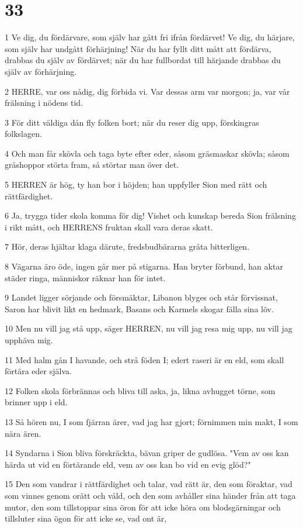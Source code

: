 \chapter{33}

\par 1 Ve dig, du fördärvare, som själv har gått fri ifrån fördärvet! Ve dig, du härjare, som själv har undgått förhärjning! När du har fyllt ditt mått att fördärva, drabbas du själv av fördärvet; när du har fullbordat till härjande drabbas du själv av förhärjning.
\par 2 HERRE, var oss nådig, dig förbida vi. Var dessas arm var morgon; ja, var vår frälsning i nödens tid.
\par 3 För ditt väldiga dån fly folken bort; när du reser dig upp, förskingras folkslagen.
\par 4 Och man får skövla och taga byte efter eder, såsom gräsmaskar skövla; såsom gräshoppor störta fram, så störtar man över det.
\par 5 HERREN är hög, ty han bor i höjden; han uppfyller Sion med rätt och rättfärdighet.
\par 6 Ja, trygga tider skola komma för dig! Vishet och kunskap bereda Sion frälsning i rikt mått, och HERRENS fruktan skall vara deras skatt.
\par 7 Hör, deras hjältar klaga därute, fredsbudbärarna gråta bitterligen.
\par 8 Vägarna äro öde, ingen går mer på stigarna. Han bryter förbund, han aktar städer ringa, människor räknar han för intet.
\par 9 Landet ligger sörjande och försmäktar, Libanon blyges och står förvissnat, Saron har blivit likt en hedmark, Basans och Karmels skogar fälla sina löv.
\par 10 Men nu vill jag stå upp, säger HERREN, nu vill jag resa mig upp, nu vill jag upphäva mig.
\par 11 Med halm gån I havande, och strå föden I; edert raseri är en eld, som skall förtära eder själva.
\par 12 Folken skola förbrännas och bliva till aska, ja, likna avhugget törne, som brinner upp i eld.
\par 13 Så hören nu, I som fjärran ärer, vad jag har gjort; förnimmen min makt, I som nära ären.
\par 14 Syndarna i Sion bliva förskräckta, bävan griper de gudlösa. "Vem av oss kan härda ut vid en förtärande eld, vem av oss kan bo vid en evig glöd?"
\par 15 Den som vandrar i rättfärdighet och talar, vad rätt är, den som föraktar, vad som vinnes genom orätt och våld, och den som avhåller sina händer från att taga mutor, den som tillstoppar sina öron för att icke höra om blodsgärningar och tillsluter sina ögon för att icke se, vad ont är,
